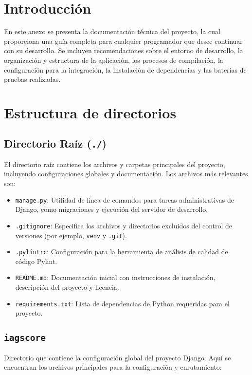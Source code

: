 
\section{Introducción}

En este anexo se presenta la documentación técnica del proyecto, la cual proporciona una guía completa para cualquier programador que desee continuar con su desarrollo. Se incluyen recomendaciones sobre el entorno de desarrollo, la organización y estructura de la aplicación, los procesos de compilación, la configuración para la integración, la instalación de dependencias y las baterías de pruebas realizadas.

\section{Estructura de directorios}


\subsection{Directorio Raíz (\texttt{./})}
El directorio raíz contiene los archivos y carpetas principales del proyecto, incluyendo configuraciones globales y documentación. Los archivos más relevantes son:

\begin{itemize}
    \item \texttt{manage.py}: Utilidad de línea de comandos para tareas administrativas de Django, como migraciones y ejecución del servidor de desarrollo.
    \item \texttt{.gitignore}: Especifica los archivos y directorios excluidos del control de versiones (por ejemplo, \texttt{venv} y \texttt{.git}).
    \item \texttt{.pylintrc}: Configuración para la herramienta de análisis de calidad de código Pylint.
    \item \texttt{README.md}: Documentación inicial con instrucciones de instalación, descripción del proyecto y licencia.
    \item \texttt{requirements.txt}: Lista de dependencias de Python requeridas para el proyecto.
\end{itemize}

\subsection{\texttt{iagscore}}
Directorio que contiene la configuración global del proyecto Django. Aquí se encuentran los archivos principales para la configuración y enrutamiento:

